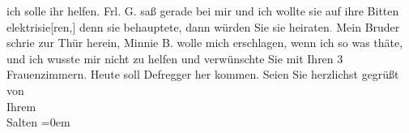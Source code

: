 \begin{ledgroupsized}[t]{13cm}
               ich solle ihr helfen. Frl. G. saß gerade bei
               mir und ich wollte sie auf ihre Bitten elektrisie{[}ren,{]} denn sie
               behauptete, dann würden Sie sie heiraten\textcolor{gray}{.} Mein Bruder schrie zur Thür herein, Minnie B. wolle mich erschlagen, wenn ich so was thäte, und
               ich wusste mir nicht zu helfen und verwünschte Sie mit Ihren 3 Frauenzimmern. \pend
           \pstart
           Heute soll Defregger her kommen. \pend
           \pstart
           Seien Sie herzlichst gegrüßt von {\\[\baselineskip]}Ihrem {\\[\baselineskip]}\spacefill\mbox{Salten}\pend
           \leftskip=0em{}
         
         \endnumbering{}\end{ledgroupsized}\begin{anhang}\end{anhang}\newcommand{\dateiname}{L03128}\newcommand{\titel}{Felix Salten an Arthur Schnitzler, 18. 8. 1893}\newcommand{\editorInnen}{Martin Anton Müller und Laura Untner}
      
